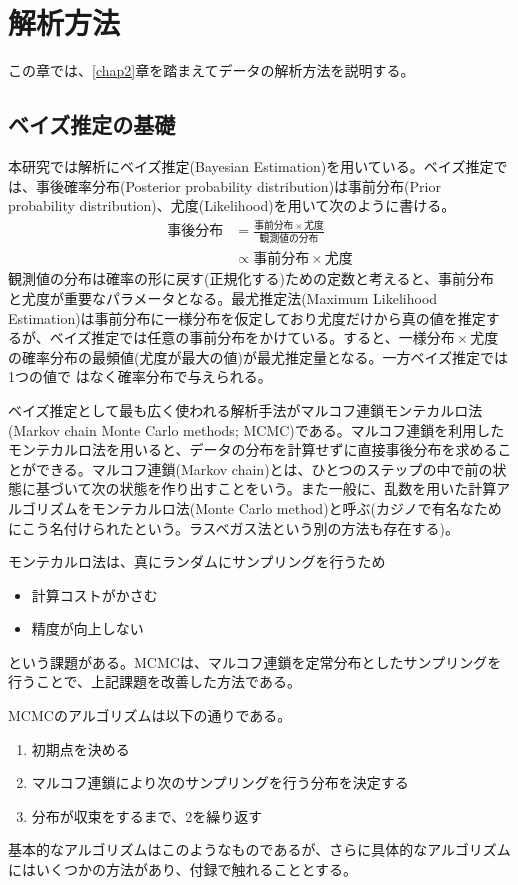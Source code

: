 \chapter{解析方法}
この章では、\ref{chap2}章を踏まえてデータの解析方法を説明する。


\section{ベイズ推定の基礎}
本研究では解析にベイズ推定(Bayesian Estimation)を用いている。ベイズ推定では、事後確率分布(Posterior probability distribution)は事前分布(Prior probability distribution)、尤度(Likelihood)を用いて次のように書ける。
\begin{align}
	事後分布 &= \frac{事前分布 \times 尤度}{観測値の分布} \\
			&\propto 事前分布 \times 尤度
\end{align}
観測値の分布は確率の形に戻す(正規化する)ための定数と考えると、事前分布 と尤度が重要なパラメータとなる。最尤推定法(Maximum Likelihood Estimation)は事前分布に一様分布を仮定しており尤度だけから真の値を推定するが、ベイズ推定では任意の事前分布をかけている。すると、$一様分布 \times 尤度$の確率分布の最頻値(尤度が最大の値)が最尤推定量となる。一方ベイズ推定では1つの値で はなく確率分布で与えられる。

ベイズ推定として最も広く使われる解析手法がマルコフ連鎖モンテカルロ法(Markov chain Monte Carlo methods; MCMC)である。マルコフ連鎖を利用したモンテカルロ法を用いると、データの分布を計算せずに直接事後分布を求めることができる。マルコフ連鎖(Markov chain)とは、ひとつのステップの中で前の状態に基づいて次の状態を作り出すことをいう。また一般に、乱数を用いた計算アルゴリズムをモンテカルロ法(Monte Carlo method)と呼ぶ(カジノで有名なためにこう名付けられたという。ラスベガス法という別の方法も存在する)。

モンテカルロ法は、真にランダムにサンプリングを行うため
\begin{itemize}
	\item{計算コストがかさむ}
	\item{精度が向上しない}
\end{itemize}
という課題がある。MCMCは、マルコフ連鎖を定常分布としたサンプリングを行うことで、上記課題を改善した方法である。

MCMCのアルゴリズムは以下の通りである。
\begin{enumerate}
	\item{初期点を決める}
	\item{マルコフ連鎖により次のサンプリングを行う分布を決定する}
	\item{分布が収束をするまで、2を繰り返す}
\end{enumerate}
基本的なアルゴリズムはこのようなものであるが、さらに具体的なアルゴリズムにはいくつかの方法があり、付録で触れることとする。

